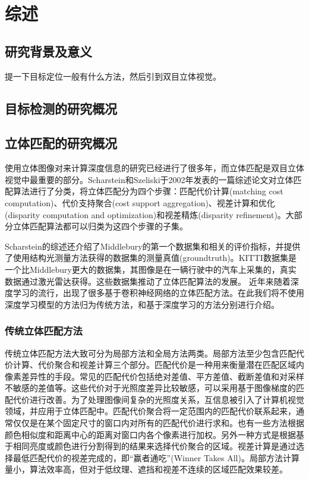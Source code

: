 
\chapter{综述}

\section{研究背景及意义}

提一下目标定位一般有什么方法，然后引到双目立体视觉。

\section{目标检测的研究概况}

\section{立体匹配的研究概况}

使用立体图像对来计算深度信息的研究已经进行了很多年\cite{Barnard:1982:CS:356893.356896}，而立体匹配是双目立体视觉中最重要的部分。Scharstein和Szeliski于2002年发表的一篇综述论文\cite{Scharstein2002}对立体匹配算法进行了分类，将立体匹配分为四个步骤：匹配代价计算(matching cost computation)、代价支持聚合(cost support aggregation)、视差计算和优化(disparity computation and optimization)和视差精炼(disparity refinement)。大部分立体匹配算法都可以归类为这四个步骤的子集。

Scharstein的综述还介绍了Middlebury的第一个数据集和相关的评价指标，并提供了使用结构光测量方法获得的数据集的测量真值(groundtruth)。KITTI数据集\cite{Geiger2012,Menze_2015_CVPR}是一个比Middlebury更大的数据集，其图像是在一辆行驶中的汽车上采集的，真实数据通过激光雷达获得。这些数据集推动了立体匹配算法的发展。
近年来随着深度学习的流行，出现了很多基于卷积神经网络的立体匹配方法。在此我们将不使用深度学习模型的方法归为传统方法，和基于深度学习的方法分别进行介绍。

\subsection{传统立体匹配方法}
传统立体匹配方法大致可分为局部方法和全局方法两类。局部方法至少包含匹配代价计算、代价聚合和视差计算三个部分。匹配代价是一种用来衡量潜在匹配区域内像素差异性的手段。常见的匹配代价包括绝对差值、平方差值、截断差值和对采样不敏感的差值\cite{Birchfield1999}等。这些代价对于光照度差异比较敏感，可以采用基于图像梯度的匹配代价进行改善\cite{SGM_3}。为了处理图像间复杂的光照度关系，互信息被引入了计算机视觉领域\cite{Viola1997}，并应用于立体匹配中\cite{SGM_6}。匹配代价聚合将一定范围内的匹配代价联系起来，通常仅仅是在某个固定尺寸的窗口内对所有的匹配代价进行求和\cite{Hirschmüller2002}。也有一些方法根据颜色相似度和距离中心的距离对窗口内各个像素进行加权\cite{SGM_10}。另外一种方式是根据基于相同亮度或颜色进行分割得到的结果来选择代价聚合的区域\cite{Zitnick:2004}。视差计算是通过选择最低匹配代价的视差完成的\cite{Hirschmüller2002}，即“赢者通吃”(Winner Takes All)。局部方法计算量小，算法效率高，但对于低纹理、遮挡和视差不连续的区域匹配效果较差。


